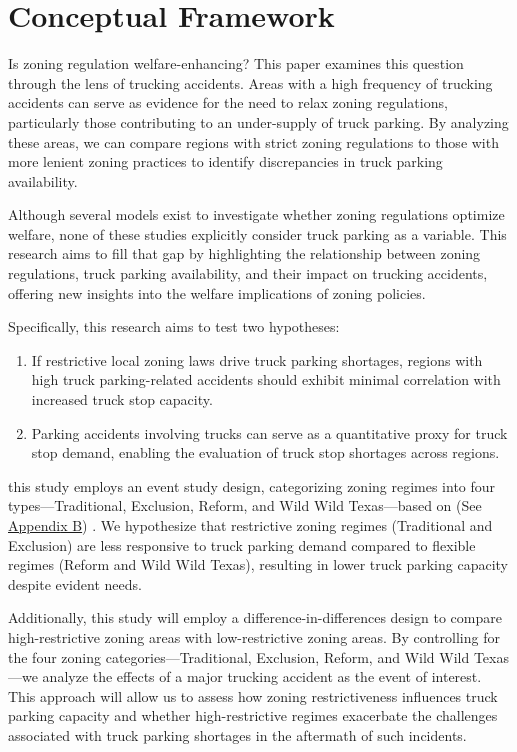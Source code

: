 \documentclass[
  12pt]{article}
\begin{document}
\section{Conceptual Framework}\label{conceptual-framework}

Is zoning regulation welfare-enhancing? This paper examines this
question through the lens of trucking accidents. Areas with a high
frequency of trucking accidents can serve as evidence for the need to
relax zoning regulations, particularly those contributing to an
under-supply of truck parking. By analyzing these areas, we can compare
regions with strict zoning regulations to those with more lenient zoning
practices to identify discrepancies in truck parking availability.

Although several models exist to investigate whether zoning regulations
optimize welfare, none of these studies explicitly consider truck
parking as a variable. This research aims to fill that gap by
highlighting the relationship between zoning regulations, truck parking
availability, and their impact on trucking accidents, offering new
insights into the welfare implications of zoning policies.

Specifically, this research aims to test two hypotheses:

\begin{enumerate}
\def\labelenumi{\arabic{enumi}.}
\item
  If restrictive local zoning laws drive truck parking shortages,
  regions with high truck parking-related accidents should exhibit
  minimal correlation with increased truck stop capacity.
\item
  Parking accidents involving trucks can serve as a quantitative proxy
  for truck stop demand, enabling the evaluation of truck stop shortages
  across regions.
\end{enumerate}

this study employs an event study design, categorizing zoning regimes
into four types---Traditional, Exclusion, Reform, and Wild Wild
Texas---based on \citep{puentesTraditionalReformedReview2006} (See
\label{sec:appendix-b}\hyperref[sec-b.-map-of-zoning-categories]{Appendi}\hyperref[sec:appendix-b]{x
B}) . We hypothesize that restrictive zoning regimes (Traditional and
Exclusion) are less responsive to truck parking demand compared to
flexible regimes (Reform and Wild Wild Texas), resulting in lower truck
parking capacity despite evident needs.

Additionally, this study will employ a difference-in-differences design
to compare high-restrictive zoning areas with low-restrictive zoning
areas. By controlling for the four zoning categories---Traditional,
Exclusion, Reform, and Wild Wild Texas---we analyze the effects of a
major trucking accident as the event of interest. This approach will
allow us to assess how zoning restrictiveness influences truck parking
capacity and whether high-restrictive regimes exacerbate the challenges
associated with truck parking shortages in the aftermath of such
incidents.
\end{document}
